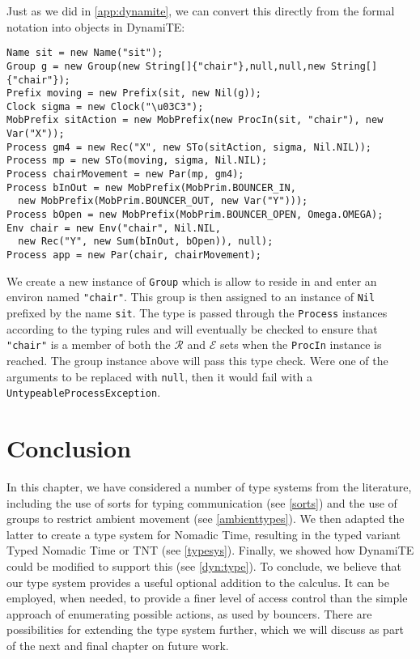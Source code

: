Just as we did in \ref{app:dynamite}, we can convert this directly
from the formal notation into objects in DynamiTE:

\begin{verbatim}
Name sit = new Name("sit");
Group g = new Group(new String[]{"chair"},null,null,new String[]{"chair"}); 
Prefix moving = new Prefix(sit, new Nil(g));
Clock sigma = new Clock("\u03C3");
MobPrefix sitAction = new MobPrefix(new ProcIn(sit, "chair"), new Var("X"));
Process gm4 = new Rec("X", new STo(sitAction, sigma, Nil.NIL));
Process mp = new STo(moving, sigma, Nil.NIL);
Process chairMovement = new Par(mp, gm4);
Process bInOut = new MobPrefix(MobPrim.BOUNCER_IN,
  new MobPrefix(MobPrim.BOUNCER_OUT, new Var("Y")));
Process bOpen = new MobPrefix(MobPrim.BOUNCER_OPEN, Omega.OMEGA);
Env chair = new Env("chair", Nil.NIL,
  new Rec("Y", new Sum(bInOut, bOpen)), null);
Process app = new Par(chair, chairMovement);
\end{verbatim} 

\noindent We create a new instance of \texttt{Group} which is allow to
reside in and enter an environ named \verb!"chair"!.  This group
is then assigned to an instance of \texttt{Nil} prefixed by the name
\texttt{sit}.  The type is passed through the \texttt{Process}
instances according to the typing rules and will eventually be checked
to ensure that \verb!"chair"! is a member of both the
$\mathscr{R}$ and $\mathscr{E}$ sets when the \texttt{ProcIn} instance
is reached.  The group instance above will pass this type check.  Were
one of the arguments to be replaced with \texttt{null}, then it would
fail with a \texttt{UntypeableProcessException}.

\section{Conclusion}

In this chapter, we have considered a number of type systems from the
literature, including the use of sorts for typing communication (see
\ref{sorts}) and the use of groups to restrict ambient movement (see
\ref{ambienttypes}).  We then adapted the latter to create a type
system for Nomadic Time, resulting in the typed variant Typed Nomadic
Time or TNT (see \ref{typesys}). Finally, we showed how DynamiTE could
be modified to support this (see \ref{dyn:type}).  To conclude, we
believe that our type system provides a useful optional addition to
the calculus.  It can be employed, when needed, to provide a finer
level of access control than the simple approach of enumerating
possible actions, as used by bouncers.  There are possibilities for
extending the type system further, which we will discuss as part of
the next and final chapter on future work.
